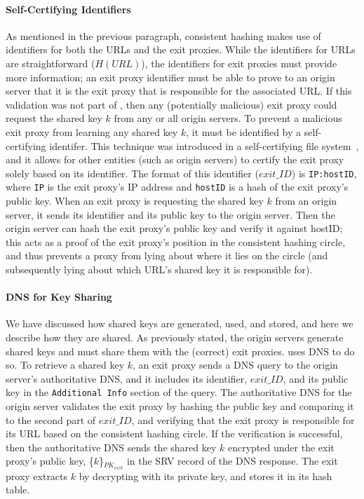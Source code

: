 \paragraph{Self-Certifying Identifiers}
As mentioned in the previous paragraph, consistent hashing makes use of identifiers for both the URLs and 
the exit proxies.  While the identifiers for URLs are straightforward ($H(URL)$), the identifiers for exit 
proxies must provide more information; an exit proxy identifier must be able to prove to an origin server that 
it is the exit proxy that is responsible for the associated URL.  If this validation was not part of \system{}, 
then any (potentially malicious) exit proxy could request the shared key $k$ from any or all origin servers.  To 
prevent a malicious exit proxy from learning any shared key $k$, it must be identified by a self-certifying 
identifer.  This technique was introduced in a self-certifying file system~\cite{mazieres2000self}, and it allows 
for other entities (such as origin servers) to certify the exit proxy solely based on its identifier.  The format 
of this identifier ($exit\_ID$) is {\tt IP:hostID}, where {\tt IP} is the exit proxy's IP address and {\tt hostID} 
is a hash of the exit proxy's public key.  When an exit proxy is requesting the shared key $k$ from an origin server, 
it sends its identifier and its public key to the origin server.  Then the origin server can hash the exit proxy's 
public key and verify it against hostID; this acts as a proof of the exit proxy's position in the consistent hashing 
circle, and thus prevents a proxy from lying about where it lies on the circle (and subsequently lying about which 
URL's shared key it is responsible for).

\paragraph{DNS for Key Sharing}
We have discussed how shared keys are generated, used, and stored, and here we describe how they are shared.  As previously 
stated, the origin servers generate shared keys and must share them with the (correct) exit proxies.  \system{} uses DNS
to do so.  To retrieve a shared key $k$, an exit proxy sends a DNS query to the origin server's authoritative DNS, and 
it includes its identifier, $exit\_ID$, and its public key in the {\tt Additional Info} section of the query.  The 
authoritative DNS for the origin server validates the exit proxy by hashing the public key and comparing it to the 
second part of $exit\_ID$, and verifying that the exit proxy is responsible for its URL based on the consistent 
hashing circle.  If the verification is successful, then the authoritative DNS sends the shared key $k$ encrypted 
under the exit proxy's public key, \{$k$\}$_{PK_{exit}}$ in the SRV record of the DNS response.  The exit proxy 
extracts $k$ by decrypting with its private key, and stores it in its hash table.

